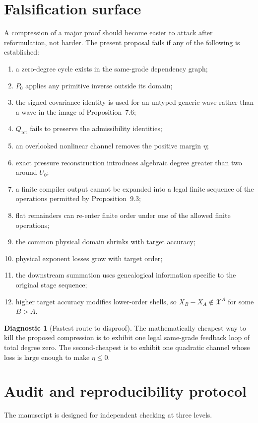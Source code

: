 \documentclass[11pt]{article}
\numberwithin{equation}{section}
\theoremstyle{highend}
\theoremstyle{definition}
\newtheorem{diagnostic}[theorem]{Diagnostic}
\newcommand{\X}{\mathcal X}
\newcommand{\Qret}{Q_{\mathrm{ret}}}
\begin{document}
\section{Falsification surface}
A compression of a major proof should become easier to attack after reformulation, not harder. The present proposal fails if any of the following is established:
\begin{enumerate}
  \item a zero-degree cycle exists in the same-grade dependency graph;
  \item $P_0$ applies any primitive inverse outside its domain;
  \item the signed covariance identity is used for an untyped generic wave rather than a wave in the image of Proposition~7.6;
  \item $\Qret$ fails to preserve the admissibility identities;
  \item an overlooked nonlinear channel removes the positive margin $\eta$;
  \item exact pressure reconstruction introduces algebraic degree greater than two around $U_0$;
  \item a finite compiler output cannot be expanded into a legal finite sequence of the operations permitted by Proposition~9.3;
  \item flat remainders can re-enter finite order under one of the allowed finite operations;
  \item the common physical domain shrinks with target accuracy;
  \item physical exponent losses grow with target order;
  \item the downstream summation uses genealogical information specific to the original stage sequence;
  \item higher target accuracy modifies lower-order shells, so $X_B-X_A\notin\X^A$ for some $B>A$.
\end{enumerate}

\begin{diagnostic}[Fastest route to disproof]
The mathematically cheapest way to kill the proposed compression is to exhibit one legal same-grade feedback loop of total degree zero. The second-cheapest is to exhibit one quadratic channel whose loss is large enough to make $\eta\le0$.
\end{diagnostic}

\section{Audit and reproducibility protocol}
The manuscript is designed for independent checking at three levels.
\end{document}
